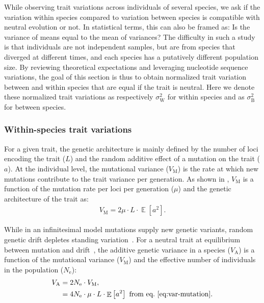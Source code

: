 \documentclass{article}
\newcommand{\Multiply}{\cdot}
\DeclareMathOperator{\E}{\mathbb{E}}
\newcommand{\Ne}{N_{\text{e}}}
\newcommand{\MutationRatePheno}{\mu}
\newcommand{\NbrLoci}{L}
\newcommand{\VarGenetic}{V_{\mathrm{A}}}
\newcommand{\VarMutation}{V_{\mathrm{M}}}
\newcommand{\GenArchi}{\NbrLoci \Multiply \E \left[ a^2 \right]}
\newcommand{\RateBetween}{\sigma^2_{\mathrm{B}}}
\newcommand{\RateWhithin}{\sigma^2_{\mathrm{W}}}
\begin{document}
While observing trait variations across individuals of several species, we ask if the variation within species compared to variation between species is compatible with neutral evolution or not. 
In statistical terms, this can also be framed as: Is the variance of means equal to the mean of variances?
The difficulty in such a study is that individuals are not independent samples, but are from species that diverged at different times, and each species has a putatively different population size.
By reviewing theoretical expectations and leveraging nucleotide sequence variations, the goal of this section is thus to obtain normalized trait variation between and within species that are equal if the trait is neutral. 
Here we denote these normalized trait variations as respectively $\RateWhithin$ for within species and as $\RateBetween$ for between species.

\subsubsection*{Within-species trait variations}

For a given trait, the genetic architecture is mainly defined by the number of loci encoding the trait ($\NbrLoci$) and the random additive effect of a mutation on the trait ($a$).
At the individual level, the mutational variance ($\VarMutation$) is the rate at which new mutations contribute to the trait variance per generation.
As shown in \textcite{lande_quantitative_1979, lande_sexual_1980}, $\VarMutation$ is a function of the mutation rate per loci per generation ($\MutationRatePheno$) and the genetic architecture of the trait as:
\begin{gather}
    \VarMutation = 2 \MutationRatePheno \Multiply \GenArchi \label{eq:var-mutation}.
\end{gather}

While in an infinitesimal model mutations supply new genetic variants, random genetic drift depletes standing variation~\parencite{turelli_commentary_2017, barton_infinitesimal_2017, sella_thinking_2019}.
For a neutral trait at equilibrium between mutation and drift~\parencite{lynch_mutation_1998}, the additive genetic variance in a species ($\VarGenetic$) is a function of the mutational variance ($\VarMutation$) and the effective number of individuals in the population ($\Ne$):
\begin{align}
    \VarGenetic & =  2 \Ne \Multiply \VarMutation, \\
    & = 4 \Ne \Multiply \MutationRatePheno \Multiply \GenArchi \text{ from eq.~\ref{eq:var-mutation}}\label{eq:var-genetic}.
\end{align}
\end{document}
